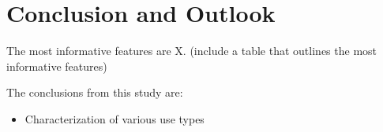 \section{Conclusion and Outlook}
\label{sec:conclusion}

The most informative features are X. (include a table that outlines the most informative features)

The conclusions from this study are:

\begin{itemize}
\item Characterization of various use types 
\end{itemize}
